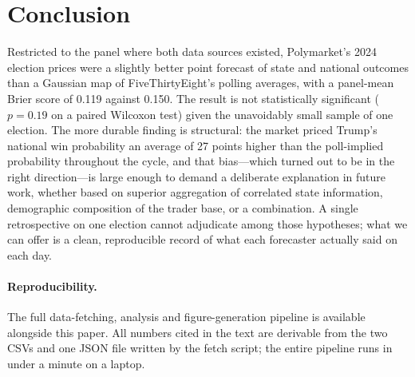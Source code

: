 \documentclass{article}
\begin{document}
\section{Conclusion}
\label{sec:conclusion}

Restricted to the panel where both data sources existed, Polymarket's
2024 election prices were a slightly better point forecast of state and
national outcomes than a Gaussian map of FiveThirtyEight's polling
averages, with a panel-mean Brier score of 0.119 against 0.150. The
result is not statistically significant ($p = 0.19$ on a paired
Wilcoxon test) given the unavoidably small sample of one election. The
more durable finding is structural: the market priced Trump's national
win probability an average of 27 points higher than the poll-implied
probability throughout the cycle, and that bias---which turned out to
be in the right direction---is large enough to demand a deliberate
explanation in future work, whether based on superior aggregation of
correlated state information, demographic composition of the trader base,
or a combination. A single retrospective on one election cannot
adjudicate among those hypotheses; what we can offer is a clean,
reproducible record of what each forecaster actually said on each day.

\paragraph{Reproducibility.}
The full data-fetching, analysis and figure-generation pipeline is
available alongside this paper. All numbers cited in the text are
derivable from the two CSVs and one JSON file written by the fetch
script; the entire pipeline runs in under a minute on a laptop.



\end{document}
